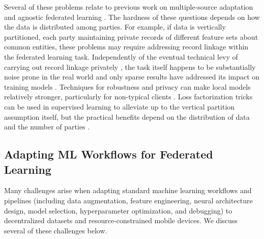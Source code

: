 \documentclass[11pt]{article}
\newcommand{\sketch}[1]{[{\color{darkgreen}{\emph{#1}}}]}
\begin{document}
Several of these problems relate to previous work on multiple-source adaptation and agnostic federated learning \citep{mansour2009domain,mansour2009domainb,hoffman2018algorithms,Mohri2019}. The hardness of these questions depends on how the data is distributed among parties. For example, if data is vertically partitioned, each party  maintaining private records of different feature sets about common entities, these problems may require addressing record linkage \cite{christen12} within the federated learning task. Independently of the eventual technical levy of carrying out record linkage privately \cite{schnell11}, the task itself happens to be substantially noise prone in the real world \cite{sEP} and only sparse results have addressed its impact on training models \cite{Hardy2017-da}. Techniques for robustness and privacy can make local models relatively stronger, particularly for non-typical clients \citep{yu2020salvaging}. Loss factorization tricks can be used in supervised learning to alleviate up to the vertical partition assumption itself, but the practical benefits depend on the distribution of data and the number of parties \cite{pnhcFL}.


\subsection{Adapting ML Workflows for Federated Learning}
\label{sec:workflows}


Many challenges arise when adapting standard machine learning workflows and pipelines (including data augmentation, feature engineering, neural architecture design, model selection, hyperparameter optimization, and debugging) to decentralized datasets and resource-constrained mobile devices. We discuss several of these challenges below.
\end{document}
